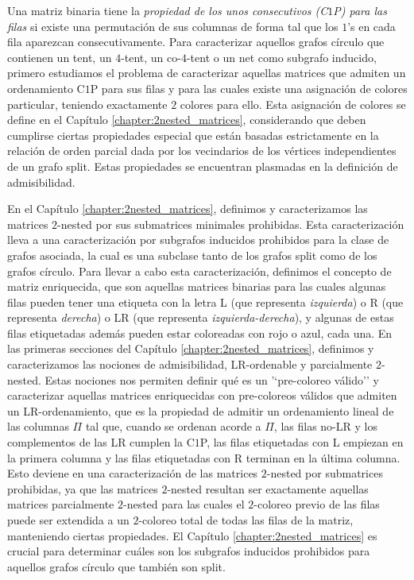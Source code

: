 \documentclass[12pt]{book}
\theoremstyle{plain}
\theoremstyle{remark}
\begin{document}
Una matriz binaria tiene la \emph{propiedad de los unos consecutivos (C$1$P) para las filas} si existe una permutación de sus columnas de forma tal que los $1$'s en cada fila aparezcan consecutivamente. 
Para caracterizar aquellos grafos círculo que contienen un tent, un $4$-tent, un co-$4$-tent o un net como subgrafo inducido, primero estudiamos el problema de caracterizar aquellas matrices que admiten un ordenamiento C$1$P para sus filas y para las cuales existe una asignación de colores particular, teniendo exactamente $2$ colores para ello. Esta asignación de colores se define en el Capítulo \ref{chapter:2nested_matrices}, considerando que deben cumplirse ciertas propiedades especial que están basadas estrictamente en la relación de orden parcial dada por los vecindarios de los vértices independientes de un grafo split. Estas propiedades se encuentran plasmadas en la definición de admisibilidad. 

En el Capítulo \ref{chapter:2nested_matrices}, definimos y caracterizamos las matrices $2$-nested por sus sub\-matrices minimales prohibidas. Esta caracterización lleva a una caracterización por sub\-grafos inducidos prohibidos para la clase de grafos asociada, la cual es una subclase tanto de los grafos split como de los grafos círculo. Para llevar a cabo esta caracterización, definimos el concepto de matriz enriquecida, que son aquellas matrices binarias para las cuales algunas filas pueden tener una etiqueta con la letra L (que representa \textit{izquierda}) o R (que representa \textit{derecha}) o LR (que representa \textit{izquierda-derecha}), y algunas de estas filas etiquetadas además pueden estar coloreadas con rojo o azul, cada una. 
En las primeras secciones del Capítulo \ref{chapter:2nested_matrices}, definimos y caracterizamos las nociones de admisibilidad, LR-ordenable y parcialmente $2$-nested. Estas nociones nos permiten definir qué es un '`pre-coloreo válido'' y caracterizar aquellas matrices enriquecidas con pre-coloreos válidos que admiten un LR-ordenamiento, que es la propiedad de admitir un ordenamiento lineal de las columnas $\Pi$ tal que, cuando se ordenan acorde a $\Pi$, las filas no-LR y los complementos de las LR cumplen la C$1$P, las filas etiquetadas con L empiezan en la primera columna y las filas etiquetadas con R terminan en la última columna. 
Esto deviene en una caracterización de las matrices $2$-nested  por submatrices prohibidas, ya que las matrices $2$-nested resultan ser exactamente aquellas matrices parcialmente $2$-nested para las cuales el $2$-coloreo previo de las filas puede ser extendida a un $2$-coloreo total de todas las filas de la matriz, manteniendo ciertas propiedades.
El Capítulo \ref{chapter:2nested_matrices} es crucial para determinar cuáles son los subgrafos inducidos prohibidos para aquellos grafos círculo que también son split. 
\end{document}
